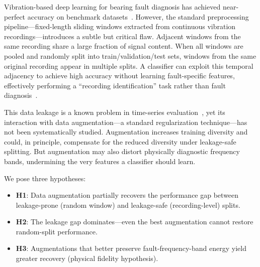 ﻿\documentclass[11pt,a4paper]{article}
\begin{document}
Vibration-based deep learning for bearing fault diagnosis has achieved near-perfect accuracy on benchmark datasets~\cite{smith2015rolling,wen2018new,zhang2017new}. However, the standard preprocessing pipeline---fixed-length sliding windows extracted from continuous vibration recordings---introduces a subtle but critical flaw. Adjacent windows from the same recording share a large fraction of signal content. When all windows are pooled and randomly split into train/validation/test sets, windows from the same original recording appear in multiple splits. A classifier can exploit this temporal adjacency to achieve high accuracy without learning fault-specific features, effectively performing a ``recording identification'' task rather than fault diagnosis~\cite{bergmeir2012use,cerqueira2020evaluating}.

This data leakage is a known problem in time-series evaluation~\cite{bergmeir2012use,cerqueira2020evaluating}, yet its interaction with data augmentation---a standard regularization technique---has not been systematically studied. Augmentation increases training diversity and could, in principle, compensate for the reduced diversity under leakage-safe splitting. But augmentation may also distort physically diagnostic frequency bands, undermining the very features a classifier should learn.

We pose three hypotheses:
\begin{itemize}[nosep]
    \item \textbf{H1}: Data augmentation partially recovers the performance gap between leakage-prone (random window) and leakage-safe (recording-level) splits.
    \item \textbf{H2}: The leakage gap dominates---even the best augmentation cannot restore random-split performance.
    \item \textbf{H3}: Augmentations that better preserve fault-frequency-band energy yield greater recovery (physical fidelity hypothesis).
\end{itemize}
\end{document}
